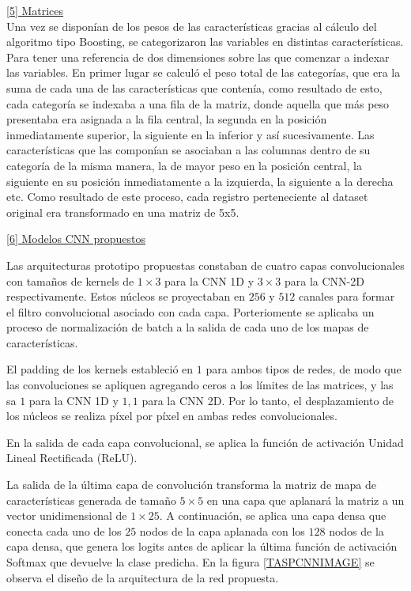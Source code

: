 \documentclass{uathesis-es}
\begin{document}
\underline{[5] Matrices}\\
Una vez se disponían de los pesos de las características gracias al cálculo del algoritmo tipo Boosting, se categorizaron las variables en distintas características. Para tener una referencia de dos dimensiones sobre las que comenzar a indexar las variables. En primer lugar se calculó el peso total de las categorías, que era la suma de cada una de las características que contenía, como resultado de esto, cada categoría se indexaba a una fila de la matriz, donde aquella que más peso presentaba era asignada a la fila central, la segunda en la posición inmediatamente superior, la siguiente en la inferior y así sucesivamente. Las características que las componían se asociaban a las columnas dentro de su categoría de la misma manera, la de mayor peso en la posición central, la siguiente en su posición inmediatamente a la izquierda, la siguiente a la derecha etc. Como resultado de este proceso, cada registro perteneciente al dataset original era transformado en una matriz de 5x5.

\underline{[6] Modelos CNN propuestos}

Las arquitecturas prototipo propuestas constaban de cuatro capas convolucionales con tamaños de kernels de $1 \times 3$ para la CNN 1D y $3 \times 3$ para la CNN-2D respectivamente. Estos núcleos se proyectaban en $256$ y $512$ canales para formar el filtro convolucional asociado con cada capa. Porteriomente se aplicaba un proceso de normalización de batch a la salida de cada uno de los mapas de características.

El padding de los kernels estableció en $1$ para ambos tipos de redes, de modo que las convoluciones se apliquen agregando ceros a los límites de las matrices, y las sa $1$ para la CNN 1D y ${1, 1}$ para la CNN 2D. Por lo tanto, el desplazamiento de los núcleos se realiza píxel por píxel en ambas redes convolucionales.

En la salida de cada capa convolucional, se aplica la función de activación Unidad Lineal Rectificada (ReLU).

La salida de la última capa de convolución transforma la matriz de mapa de características generada de tamaño $5 \times 5$ en una capa que aplanará la matriz a un vector unidimensional de $1 \times 25$. A continuación, se aplica una capa densa que conecta cada uno de los $25$ nodos de la capa aplanada con los $128$ nodos de la capa densa, que genera los logits antes de aplicar la última función de activación Softmax que devuelve la clase predicha. En la figura \ref{TASPCNNIMAGE} se observa el diseño de la arquitectura de la red propuesta.
\end{document}
